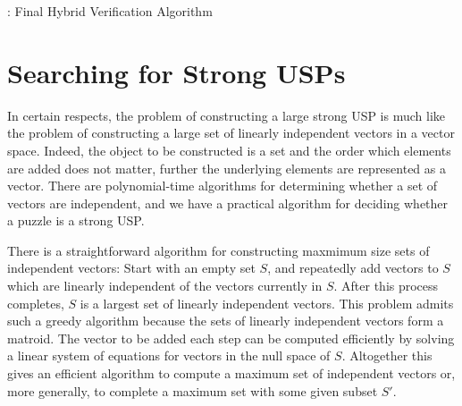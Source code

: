 \documentclass[11pt]{article}
\begin{document}
\begin{algorithm}
  \caption{: Final Hybrid Verification Algorithm}
  \label{alg:2dm}
\begin{algorithmic}[1]
    \EndIf
    \EndIf
    \EndIf
  \EndFunction
\end{algorithmic}
\end{algorithm}

\section{Searching for Strong USPs}
\label{sec:search}

In certain respects, the problem of constructing a large strong USP is
much like the problem of constructing a large set of linearly
independent vectors in a vector space.  Indeed, the object to be
constructed is a set and the order which elements are added does not
matter, further the underlying elements are represented as a vector.
There are polynomial-time algorithms for determining whether a set of
vectors are independent, and we have a practical algorithm for
deciding whether a puzzle is a strong USP. 

There is a straightforward algorithm for constructing maxmimum size
sets of independent vectors: Start with an empty set $S$, and
repeatedly add vectors to $S$ which are linearly independent of the
vectors currently in $S$.  After this process completes, $S$ is a
largest set of linearly independent vectors.  This problem admits such
a greedy algorithm because the sets of linearly independent vectors
form a matroid.  The vector to be added each step can be computed
efficiently by solving a linear system of equations for vectors in the
null space of $S$.  Altogether this gives an efficient algorithm to
compute a maximum set of independent vectors or, more generally, to
complete a maximum set with some given subset $S'$.
\end{document}
